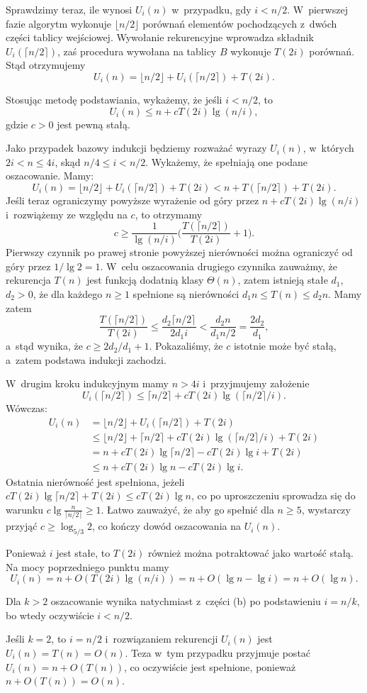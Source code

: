 Sprawdzimy teraz, ile wynosi $U_i(n)$ w~przypadku, gdy $i<n/2$.
W~pierwszej fazie algorytm wykonuje $\lfloor n/2\rfloor$ porównań elementów pochodzących z~dwóch części tablicy wejściowej.
Wywołanie rekurencyjne wprowadza składnik $U_i(\lceil n/2\rceil)$, zaś procedura  wywołana na tablicy $B$ wykonuje $T(2i)$ porównań.
Stąd otrzymujemy
\[
    U_i(n) = \lfloor n/2\rfloor+U_i(\lceil n/2\rceil)+T(2i).
\]

\subproblem %
Stosując metodę podstawiania, wykażemy, że jeśli $i<n/2$, to
\[
	U_i(n) \le n+cT(2i)\lg(n/i),
\]
gdzie $c>0$ jest pewną stałą.

Jako przypadek bazowy indukcji będziemy rozważać wyrazy $U_i(n)$, w~których $2i<n\le4i$, skąd $n/4\le i<n/2$.
Wykażemy, że spełniają one podane oszacowanie.
Mamy:
\[
    U_i(n) = \lfloor n/2\rfloor+U_i(\lceil n/2\rceil)+T(2i) < n+T(\lceil n/2\rceil)+T(2i).
\]
Jeśli teraz ograniczymy powyższe wyrażenie od góry przez $n+cT(2i)\lg(n/i)$ i~rozwiążemy ze względu na $c$, to otrzymamy
\[
    c \ge \frac{1}{\lg(n/i)}\biggl(\frac{T(\lceil n/2\rceil)}{T(2i)}+1\biggr).
\]
Pierwszy czynnik po prawej stronie powyższej nierówności można ograniczyć od góry przez $1/\lg2=1$.
W~celu oszacowania drugiego czynnika zauważmy, że rekurencja $T(n)$ jest funkcją dodatnią klasy $\Theta(n)$, zatem istnieją stałe $d_1$, $d_2>0$, że dla każdego $n\ge1$ spełnione są nierówności $d_1n\le T(n)\le d_2n$.
Mamy zatem
\[
    \frac{T(\lceil n/2\rceil)}{T(2i)} \le \frac{d_2\lceil n/2\rceil}{2d_1i} < \frac{d_2n}{d_1n/2} = \frac{2d_2}{d_1},
\]
a~stąd wynika, że $c\ge2d_2/d_1+1$.
Pokazaliśmy, że $c$ istotnie może być stałą, a~zatem podstawa indukcji zachodzi.

W~drugim kroku indukcyjnym mamy $n>4i$ i~przyjmujemy założenie
\[
    U_i(\lceil n/2\rceil) \le \lceil n/2\rceil+cT(2i)\lg(\lceil n/2\rceil/i).
\]
Wówczas:
\begin{align*}
    U_i(n) &= \lfloor n/2\rfloor+U_i(\lceil n/2\rceil)+T(2i) \\
	&\le \lfloor n/2\rfloor+\lceil n/2\rceil+cT(2i)\lg(\lceil n/2\rceil/i)+T(2i) \\
	&= n+cT(2i)\lg\lceil n/2\rceil-cT(2i)\lg i+T(2i) \\
	&\le n+cT(2i)\lg n-cT(2i)\lg i.
\end{align*}
Ostatnia nierówność jest spełniona, jeżeli $cT(2i)\lg\lceil n/2\rceil+T(2i)\le cT(2i)\lg n$, co po uproszczeniu sprowadza się do warunku $c\lg\frac{n}{\lceil n/2\rceil}\ge1$.
Łatwo zauważyć, że aby go spełnić dla $n\ge5$, wystarczy przyjąć $c\ge\log_{5/3}2$, co kończy dowód oszacowania na $U_i(n)$.

\subproblem %
Ponieważ $i$ jest stałe, to $T(2i)$ również można potraktować jako wartość stałą.
Na mocy poprzedniego punktu mamy
\[
	U_i(n) = n+O(T(2i)\lg(n/i)) = n+O(\lg n-\lg i) = n+O(\lg n).
\]

\subproblem %
Dla $k>2$ oszacowanie wynika natychmiast z~części (b) po podstawieniu $i=n/k$, bo wtedy oczywiście $i<n/2$.

Jeśli $k=2$, to $i=n/2$ i~rozwiązaniem rekurencji $U_i(n)$ jest $U_i(n)=T(n)=O(n)$.
Teza w~tym przypadku przyjmuje postać $U_i(n)=n+O(T(n))$, co oczywiście jest spełnione, ponieważ $n+O(T(n))=O(n)$.
